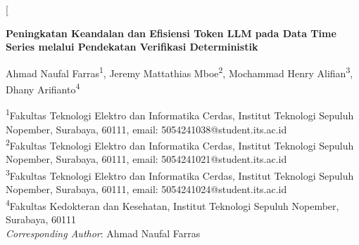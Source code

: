 \documentclass[10pt,a4paper,twocolumn]{article}
\begin{document}
\twocolumn[{%
\begin{@twocolumnfalse}
\thispagestyle{fancy}
\vspace{0.5em}
\begin{center}
  {\LARGE\bfseries Peningkatan Keandalan dan Efisiensi Token LLM pada Data
   Time Series melalui Pendekatan Verifikasi Deterministik\par}
  \vspace{1.2em}
  {\normalsize Ahmad Naufal Farras\textsuperscript{1}, Jeremy Mattathias
   Mboe\textsuperscript{2}, Mochammad Henry Alifian\textsuperscript{3},
   Dhany Arifianto\textsuperscript{4}\par}
  \vspace{0.6em}
  {\footnotesize
   \textsuperscript{1}Fakultas Teknologi Elektro dan Informatika Cerdas,
   Institut Teknologi Sepuluh Nopember, Surabaya, 60111,
   email: 5054241038@student.its.ac.id\\
   \textsuperscript{2}Fakultas Teknologi Elektro dan Informatika Cerdas,
   Institut Teknologi Sepuluh Nopember, Surabaya, 60111,
   email: 5054241021@student.its.ac.id\\
   \textsuperscript{3}Fakultas Teknologi Elektro dan Informatika Cerdas,
   Institut Teknologi Sepuluh Nopember, Surabaya, 60111,
   email: 5054241024@student.its.ac.id\\
   \textsuperscript{4}Fakultas Kedokteran dan Kesehatan,
   Institut Teknologi Sepuluh Nopember, Surabaya, 60111\\[0.3em]
   \textit{Corresponding Author}: Ahmad Naufal Farras\par}
\end{center}
\vspace{0.6em}


\end{@twocolumnfalse}}
\end{document}
